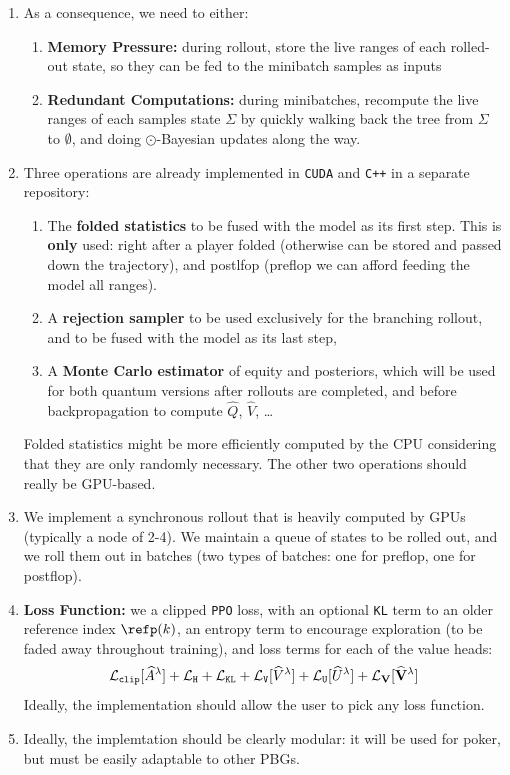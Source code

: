 \documentclass[12pt, a4paper]{article}
\begin{document}
\begin{enumerate}
  \item As a consequence, we need to either:
  \begin{enumerate}
    \item \textbf{Memory Pressure:} during rollout, store the live ranges of each rolled-out state, so they can be fed to the minibatch samples as inputs
    \item \textbf{Redundant Computations:} during minibatches, recompute the live ranges of each samples state $\Sigma$ by quickly walking back the tree from $\Sigma$ to $\emptyset$, and doing $\odot$-Bayesian updates along the way.
  \end{enumerate}

  \item Three operations are already implemented in \texttt{CUDA} and \texttt{C++} in a separate repository:
  \begin{enumerate}
    \item The \textbf{folded statistics} to be fused with the model as its first step.
    This is \textbf{only} used: right after a player folded (otherwise can be stored and passed down the trajectory), and postlfop (preflop we can afford feeding the model all ranges). 
    \item A \textbf{rejection sampler} to be used exclusively for the branching rollout, and to be fused with the model as its last step,
    \item A \textbf{Monte Carlo estimator} of equity and posteriors, which will be used for both quantum versions after rollouts are completed, and before backpropagation to compute $\widehat{Q}$, $\widehat{V}$, \ldots
  \end{enumerate} 
  Folded statistics might be more efficiently computed by the CPU considering that they are only randomly necessary.
  The other two operations should really be GPU-based.

  \item We implement a synchronous rollout that is heavily computed by GPUs (typically a node of 2-4).
  We maintain a queue of states to be rolled out, and we roll them out in batches (two types of batches: one for preflop, one for postflop).

  \item \textbf{Loss Function:} we a clipped \texttt{PPO} loss, with an optional \texttt{KL} term to an older reference index $\refp(k)$, an entropy term to encourage exploration (to be faded away throughout training), and loss terms for each of the value heads:
  \[
    \mathcal L_{\tt clip}[\widehat A^\lambda]+\mathcal L_{\tt H} + \mathcal L_{\tt KL} + \mathcal L_{\tt V}[\widehat V^\lambda] + \mathcal L_{\tt U}[\widehat U^\lambda]+\mathcal L_{\mathbf V}[\widehat{\mathbf V}^\lambda]
  \]
  Ideally, the implementation should allow the user to pick any loss function.

  \item Ideally, the implemtation should be clearly modular: it will be used for poker, but must be easily adaptable to other PBGs.
\end{enumerate}
\end{document}
